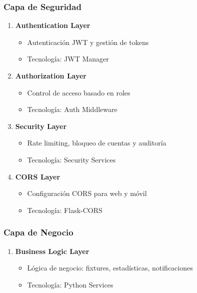 \documentclass[
  spanish,
  11pt,
  letterpaper,
]{book}
\providecommand{\tightlist}{%
  \setlength{\itemsep}{0pt}\setlength{\parskip}{0pt}}
\begin{document}
\subsubsection{Capa de Seguridad}\label{capa-de-seguridad}

\begin{enumerate}
\def\labelenumi{\arabic{enumi}.}
\setcounter{enumi}{2}
\tightlist
\item
  \textbf{Authentication Layer}

  \begin{itemize}
  \tightlist
  \item
    Autenticación JWT y gestión de tokens
  \item
    Tecnología: JWT Manager
  \end{itemize}
\item
  \textbf{Authorization Layer}

  \begin{itemize}
  \tightlist
  \item
    Control de acceso basado en roles
  \item
    Tecnología: Auth Middleware
  \end{itemize}
\item
  \textbf{Security Layer}

  \begin{itemize}
  \tightlist
  \item
    Rate limiting, bloqueo de cuentas y auditoría
  \item
    Tecnología: Security Services
  \end{itemize}
\item
  \textbf{CORS Layer}

  \begin{itemize}
  \tightlist
  \item
    Configuración CORS para web y móvil
  \item
    Tecnología: Flask-CORS
  \end{itemize}
\end{enumerate}

\subsubsection{Capa de Negocio}\label{capa-de-negocio}

\begin{enumerate}
\def\labelenumi{\arabic{enumi}.}
\setcounter{enumi}{6}
\tightlist
\item
  \textbf{Business Logic Layer}

  \begin{itemize}
  \tightlist
  \item
    Lógica de negocio: fixtures, estadísticas, notificaciones
  \item
    Tecnología: Python Services
  \end{itemize}
\end{enumerate}
\end{document}

